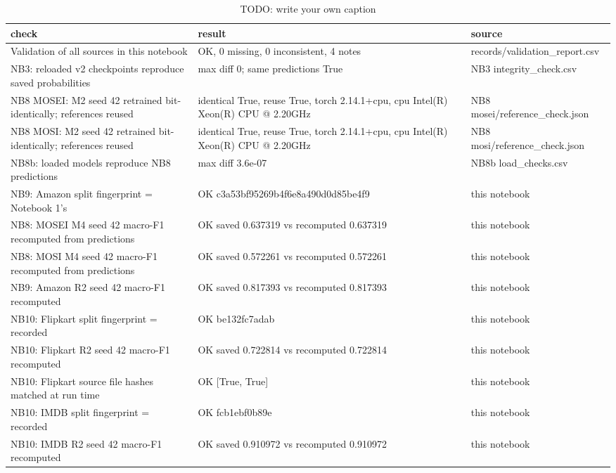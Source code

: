 \begin{table}[h]
\caption{TODO: write your own caption}\label{tab:R04-reproducibility-checks}
\scriptsize
\begin{tabularx}{\textwidth}{>{\raggedright\arraybackslash}X>{\raggedright\arraybackslash}X>{\raggedright\arraybackslash}X}
\toprule
check & result & source \\
\midrule
Validation of all sources in this notebook & 347 OK, 0 missing, 0 inconsistent, 4 notes & records/\allowbreak{}validation\_\allowbreak{}report.csv \\
NB3: reloaded v2 checkpoints reproduce saved probabilities & max diff 0; same predictions True & NB3 integrity\_\allowbreak{}check.csv \\
NB8 MOSEI: M2 seed 42 retrained bit-identically; references reused & identical True, reuse True, torch 2.14.1+cpu, cpu Intel(R) Xeon(R) CPU @ 2.20GHz & NB8 mosei/\allowbreak{}reference\_\allowbreak{}check.json \\
NB8 MOSI: M2 seed 42 retrained bit-identically; references reused & identical True, reuse True, torch 2.14.1+cpu, cpu Intel(R) Xeon(R) CPU @ 2.20GHz & NB8 mosi/\allowbreak{}reference\_\allowbreak{}check.json \\
NB8b: loaded models reproduce NB8 predictions & max diff 3.6e-07 & NB8b load\_\allowbreak{}checks.csv \\
NB9: Amazon split fingerprint = Notebook 1's & OK c3a53bf95269b4f6e8a490d0d85be4f9 & this notebook \\
NB8: MOSEI M4 seed 42 macro-F1 recomputed from predictions & OK saved 0.637319 vs recomputed 0.637319 & this notebook \\
NB8: MOSI M4 seed 42 macro-F1 recomputed from predictions & OK saved 0.572261 vs recomputed 0.572261 & this notebook \\
NB9: Amazon R2 seed 42 macro-F1 recomputed & OK saved 0.817393 vs recomputed 0.817393 & this notebook \\
NB10: Flipkart split fingerprint = recorded & OK be132fc7adab & this notebook \\
NB10: Flipkart R2 seed 42 macro-F1 recomputed & OK saved 0.722814 vs recomputed 0.722814 & this notebook \\
NB10: Flipkart source file hashes matched at run time & OK [True, True] & this notebook \\
NB10: IMDB split fingerprint = recorded & OK fcb1ebf0b89e & this notebook \\
NB10: IMDB R2 seed 42 macro-F1 recomputed & OK saved 0.910972 vs recomputed 0.910972 & this notebook \\

\end{tabularx}
\end{table}
